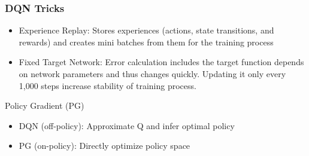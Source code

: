 










\begin{frame}[fragile]\frametitle{DQN Tricks}

\begin{itemize}
\item Experience Replay: Stores experiences (actions, state transitions, and rewards) and creates mini batches from them for the training process
\item Fixed Target Network: Error calculation includes the target function depends on network parameters and thus changes quickly. Updating it only every 1,000 steps increase stability of training process.
\end{itemize}

Policy Gradient (PG)
\begin{itemize}
\item DQN (off-policy): Approximate Q and infer optimal policy
\item PG (on-policy): Directly optimize policy space
\end{itemize}

\end{frame}


